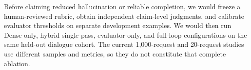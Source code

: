 Before claiming reduced hallucination or reliable completion, we would freeze a human-reviewed rubric, obtain independent claim-level judgments, and calibrate evaluator thresholds on separate development examples. We would then run Dense-only, hybrid single-pass, evaluator-only, and full-loop configurations on the same held-out dialogue cohort. The current 1,000-request and 20-request studies use different samples and metrics, so they do not constitute that complete ablation.

